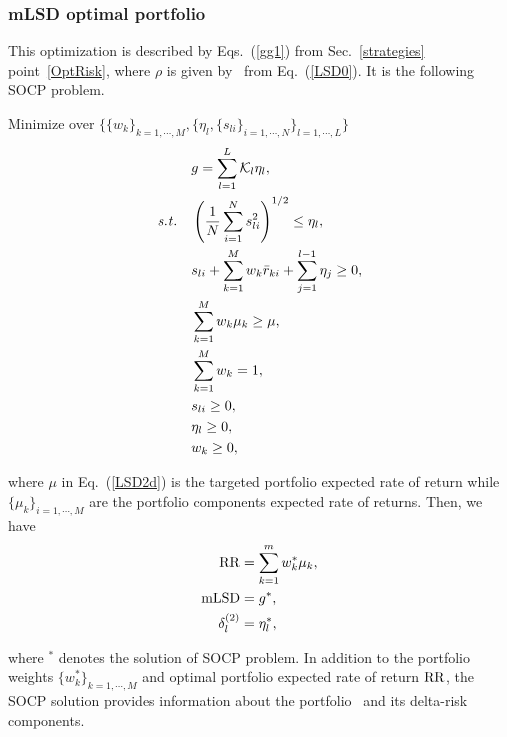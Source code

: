 \BackToContents

\subsubsection{mLSD optimal portfolio}
This optimization is described by Eqs.\ (\ref{gg1}) from Sec.~\ref{strategies} point~\ref{OptRisk},
where $\rho$ is given by \mLSD\ from Eq.~(\ref{LSD0}).
It is the following SOCP problem.

\bigskip
\noindent Minimize over $\{ \{w_k\}_{k=1,\cdots,M}, \{ \eta_l, \{ s_{li} \}_{i=1,\cdots,N} \}_{l=1,\cdots,L} \}$
\begin{subequations}\label{LSD2}
\begin{align}
    & g = \sum_{l=1}^L \cK_l \eta_l, \label{LSD2a} \\
    \st & \left( \frac{1}{N} \sum_{i=1}^N s_{li}^2 \right)^{1/2} \leq \eta_l, \label{LSD2b} \\
        & s_{li} + \sum_{k=1}^M w_k\br_{ki} + \sum_{j=1}^{l-1}\eta_j \geq 0, \label{LSD2c} \\
        & \sum_{k=1}^M w_k \mu_k \geq \mu, \label{LSD2d} \\
        & \sum_{k=1}^M w_k = 1, \label{LSD2e} \\
        & s_{li} \geq 0, \label{LSD2f} \\
        & \eta_l \geq 0, \label{LSD2h} \\
        & w_k \geq 0, \label{LSD2g}
\end{align}
\end{subequations}

\noindent where $\mu$ in Eq.~(\ref{LSD2d}) is the targeted portfolio expected rate of return while $\{\mu_k\}_{i=1,\cdots,M}$
are the portfolio components expected rate of returns.
Then, we have
\begin{subequations}\label{LSD3}
\begin{align}
    \RR &= \sum_{k=1}^m w_k^* \mu_k, \label{LSD3a} \\
    \mLSD &= g^*, \label{LSD3b} \\
    \delta^{(2)}_l & = \eta_l^*, \label{LSD3c}
\end{align}
\end{subequations}

\noindent where $^*$ denotes the solution of SOCP problem.
In addition to the portfolio weights $\{w_k^*\}_{k=1,\cdots,M}$ and optimal portfolio expected rate of return ${\rm RR}$,
the SOCP solution provides information about the portfolio \mLSD\ and its delta-risk
components.


